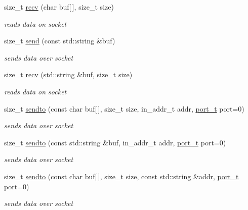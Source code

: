 \begin{CompactItemize}
size\_\-t \hyperlink{classsocketpp_1_1BaseSocket_08b3e29d019575293fa134c6d91d6cbb}{recv} (char buf\mbox{[}$\,$\mbox{]}, size\_\-t size)
\begin{CompactList}\small\item\em reads data on socket \item\end{CompactList}\item 
size\_\-t \hyperlink{classsocketpp_1_1BaseSocket_fb896f016a243ddbb661acc7b05826bf}{send} (const std::string \&buf)
\begin{CompactList}\small\item\em sends data over socket \item\end{CompactList}\item 
size\_\-t \hyperlink{classsocketpp_1_1BaseSocket_25fc62d259f6d12f1b1a5001a7512897}{recv} (std::string \&buf, size\_\-t size)
\begin{CompactList}\small\item\em reads data on socket \item\end{CompactList}\item 
size\_\-t \hyperlink{classsocketpp_1_1BaseSocket_33ef257bb6eb0f23ae0680df57738f3a}{sendto} (const char buf\mbox{[}$\,$\mbox{]}, size\_\-t size, in\_\-addr\_\-t addr, \hyperlink{namespacesocketpp_5517ef80f249b891a2ba64b95fc1e723}{port\_\-t} port=0)
\begin{CompactList}\small\item\em sends data over socket \item\end{CompactList}\item 
size\_\-t \hyperlink{classsocketpp_1_1BaseSocket_d12e08b6f67a95a3181403c70f306f88}{sendto} (const std::string \&buf, in\_\-addr\_\-t addr, \hyperlink{namespacesocketpp_5517ef80f249b891a2ba64b95fc1e723}{port\_\-t} port=0)
\begin{CompactList}\small\item\em sends data over socket \item\end{CompactList}\item 
size\_\-t \hyperlink{classsocketpp_1_1BaseSocket_2b591cefe9fd8ac9f46ed7fbdd8caa82}{sendto} (const char buf\mbox{[}$\,$\mbox{]}, size\_\-t size, const std::string \&addr, \hyperlink{namespacesocketpp_5517ef80f249b891a2ba64b95fc1e723}{port\_\-t} port=0)
\begin{CompactList}\small\item\em sends data over socket \item\end{CompactList}\item 

\end{CompactItemize}
